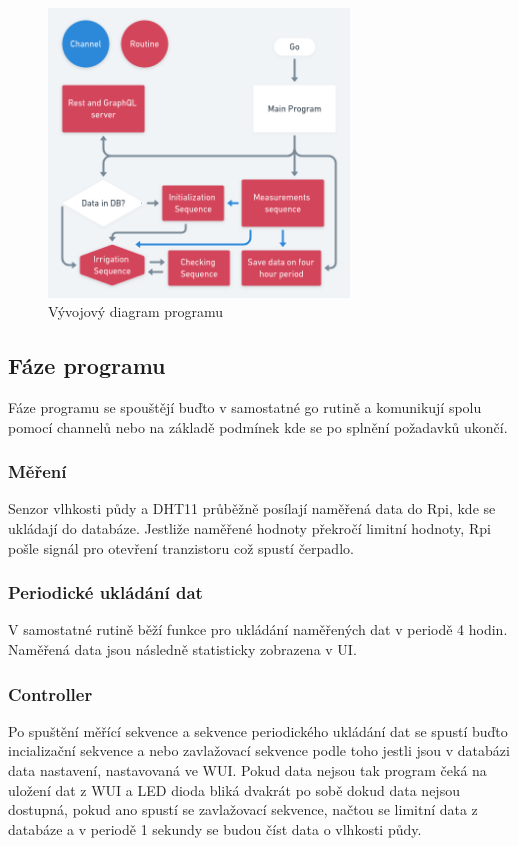 \documentclass[11pt,a4paper]{article}
\begin{document}
\begin{figure}[h]
	\centering
	\includegraphics[width=8cm]{go.png}
	\caption{Vývojový diagram programu}
\end{figure}

\subsection{Fáze programu}

Fáze programu se spouštějí buďto v samostatné go rutině a komunikují spolu
pomocí channelů nebo na základě podmínek kde se po splnění požadavků ukončí.

\subsubsection{Měření}

Senzor vlhkosti půdy a DHT11 průběžně posílají naměřená data do Rpi, kde se
ukládají do databáze. Jestliže naměřené hodnoty překročí limitní hodnoty, Rpi
pošle signál pro otevření tranzistoru což spustí čerpadlo.

\subsubsection{Periodické ukládání dat}

V samostatné rutině běží funkce pro ukládání naměřených dat v periodě 4 hodin.
Naměřená data jsou následně statisticky zobrazena v UI.

\subsubsection{Controller}

Po spuštění měřící sekvence a sekvence periodického ukládání dat se spustí
buďto incializační sekvence a nebo zavlažovací sekvence podle toho jestli jsou
v databázi data nastavení, nastavovaná ve WUI. Pokud data nejsou tak program
čeká na uložení dat z WUI a LED dioda bliká dvakrát po sobě dokud data nejsou
dostupná, pokud ano spustí se zavlažovací sekvence, načtou se limitní data z
databáze a v periodě 1 sekundy se budou číst data o vlhkosti půdy.
\end{document}
